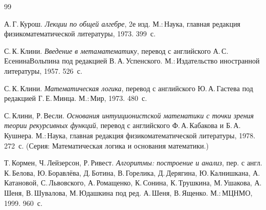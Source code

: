 \begin{thebibliography}{99}
%
%

А.\,Г.\,Курош. \textit{Лекции по общей алгебре}, 2\д е изд.
М.:\,Нау\-ка, главная редакция физико\д математической литературы,
1973. 399~с.

С.\,К.\,Клини. \textit{Введение в метаматематику}, перевод с английского
А.\,С.\,Есенина\д Вольпина под редакцией В.\,А.\,Успенского. М.:\,Издательство
иностранной литературы, 1957. 526~с.


С.\,К.\,Клини. \textit{Математическая логика}, перевод с английского
Ю.\,А.\,Гастева под редакцией Г.\,Е.\,Минца. М.:\,Мир, 1973. 480~с.


С.\,Клини, Р.\,Весли. \textit{Основания интуиционистской
математики с точки зрения теории рекурсивных функций}, перевод с
английского Ф.\,А.\,Кабакова и Б.\,А.\,Кушнера.
М.:\,Наука, главная редакция физико\д математической литературы,
1978. 272~с. (Серия: Математическая логика и основания математики.)


Т.\,Кормен, Ч.\,Лейзерсон, Р.\,Ривест. \textit{Алгоритмы:
построение и анализ}, пер. с англ. К.\,Белова,
Ю.\,Бо\-рав\-лё\-ва, Д.\,Ботина, В.\,Го\-ре\-ли\-ка, Д.\,Дерягина,
Ю.\,Кал\-ниш\-кана, А.\,Ка\-та\-но\-вой, С.\,Львовс\-ко\-го,
А.\,Ро\-ма\-щен\-ко, К.\,Сонина, К.\,Трушкина, М.\,Ушакова,
А.\,Ше\-ня, В.\,Шувалова, М.\,Юдашкина под ред. А.\,Шеня,
В.\,Ященко. М.:\,МЦНМО, 1999. 960~с.



\end{thebibliography}
